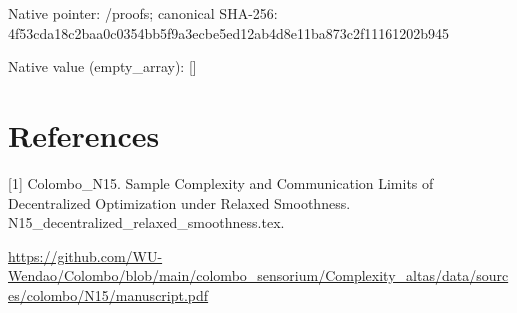 \documentclass[10pt,a4paper]{article}
\begin{document}
Native pointer: /proofs; canonical SHA-256: 4f53cda18c2baa0c0354bb5f\allowbreak{}9a3ecbe5ed12ab4d8e11ba87\allowbreak{}3c2f11161202b945



Native value (empty\_array): []



\section{References}


[1] Colombo\_N15. Sample Complexity and Communication Limits of Decentralized Optimization under Relaxed Smoothness. N15\_decentralized\_relaxe\allowbreak{}d\_smoothness.tex.



\url{https://github.com/WU-Wendao/Colombo/blob/main/colombo_sensorium/Complexity_altas/data/sources/colombo/N15/manuscript.pdf}
\end{document}
